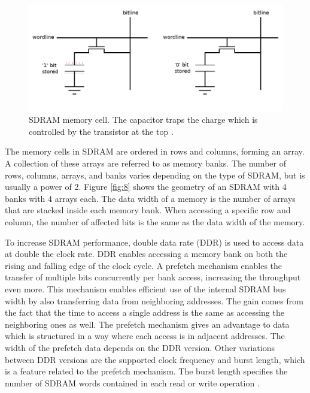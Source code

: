 \documentclass[12pt]{report}
\begin{document}
\begin{figure}[h]
    \centering
    \includegraphics[scale=0.4]{figures/DRAM.jpg}
    \caption{SDRAM memory cell. The capacitor traps the charge which is controlled by the transistor at the top \citep{SDRAMFLASH}.}
    \label{fig:7}
\end{figure}

The memory cells in SDRAM are ordered in rows and columns, forming an array. A collection of these arrays are referred to as memory banks. 
The number of rows, columns, arrays, and banks varies depending on the type of SDRAM, but is usually a power of 2. Figure \ref{fig:8} shows the geometry of an SDRAM with 4 banks with 4 arrays each. The data width of a memory is the number of arrays that are stacked inside each memory bank. When accessing a specific row and column, the number of affected bits is the same as the data width of the memory.
\par
To increase SDRAM performance, double data rate (DDR) is used to access data at double the clock rate. DDR enables accessing a memory bank on both the rising and falling edge of the clock cycle. A prefetch mechanism enables the transfer of multiple bits concurrently per bank access, increasing the throughput even more. This mechanism enables efficient use of the internal SDRAM bus width by also transferring data from neighboring addresses. The gain comes from the fact that the time to access a single address is the same as accessing the neighboring ones as well. The prefetch mechanism gives an advantage to data which is structured in a way where each access is in adjacent addresses. The width of the prefetch data depends on the DDR version. Other variations between DDR versions are the supported clock frequency and burst length, which is a feature related to the prefetch mechanism. The burst length specifies the number of SDRAM words contained in each read or write operation \citep{MicronSDRAMGeneral}.
\end{document}

